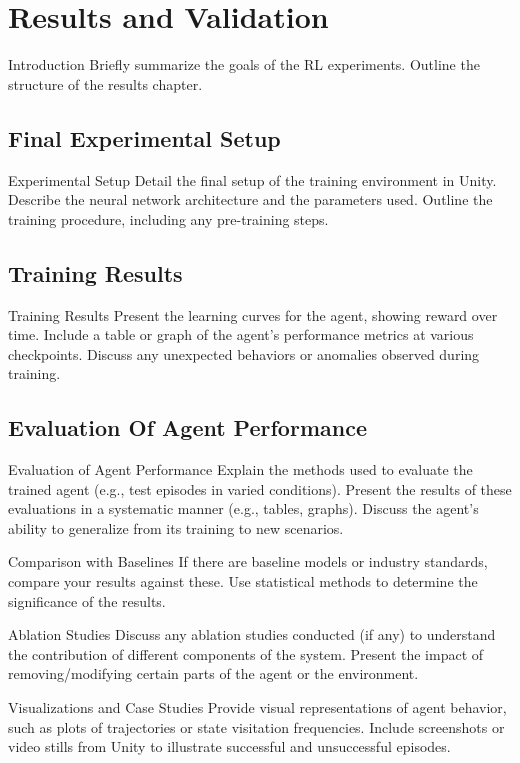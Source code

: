 

\let\textcircled=\pgftextcircled\chapter{Results and Validation}

Introduction
Briefly summarize the goals of the RL experiments.
Outline the structure of the results chapter.

\section{Final Experimental Setup}
Experimental Setup
Detail the final setup of the training environment in Unity.
Describe the neural network architecture and the parameters used.
Outline the training procedure, including any pre-training steps.

\section{Training Results}
Training Results
Present the learning curves for the agent, showing reward over time.
Include a table or graph of the agent’s performance metrics at various checkpoints.
Discuss any unexpected behaviors or anomalies observed during training.

\section{Evaluation Of Agent Performance}
Evaluation of Agent Performance
Explain the methods used to evaluate the trained agent (e.g., test episodes in varied conditions).
Present the results of these evaluations in a systematic manner (e.g., tables, graphs).
Discuss the agent’s ability to generalize from its training to new scenarios.

Comparison with Baselines
If there are baseline models or industry standards, compare your results against these.
Use statistical methods to determine the significance of the results.

Ablation Studies
Discuss any ablation studies conducted (if any) to understand the contribution of different components of the system.
Present the impact of removing/modifying certain parts of the agent or the environment.

Visualizations and Case Studies
Provide visual representations of agent behavior, such as plots of trajectories or state visitation frequencies.
Include screenshots or video stills from Unity to illustrate successful and unsuccessful episodes.

